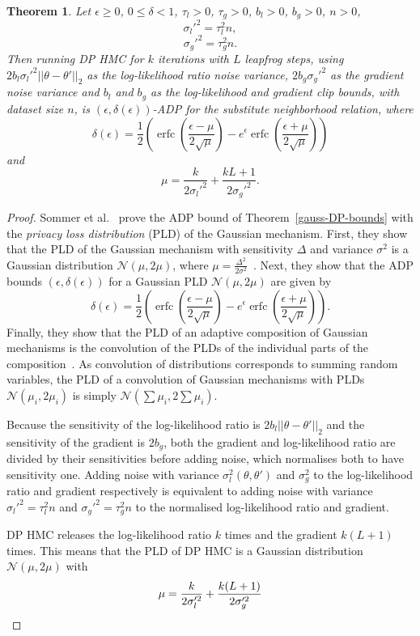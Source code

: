 \documentclass[english,twoside,openright]{HYgraduMLDS}
\newtheorem{theorem}[lemma]{Theorem}
\newcommand{\caln}{{\mathcal{N}}}
\DeclareMathOperator{\erfc}{erfc}
\begin{document}
\begin{theorem}\label{dp_hmc_theorem_adp}
  Let \(\epsilon \geq 0\), \(0 \leq \delta < 1\), \(\tau_{l} > 0\),
  \(\tau_{g} > 0\), \(b_{l} > 0\), \(b_{g} > 0\), \(n > 0\),
  \[
    \sigma_{l}'^{2} = \tau_{l}^{2}n,
  \]
  \[
    \sigma_{g}'^{2} = \tau_{g}^{2}n.
  \]
  Then running DP HMC for \(k\) iterations with \(L\) leapfrog steps,
  using \(2b_{l}\sigma_{l}'^{2}||\theta - \theta'||_{2}\) as the log-likelihood ratio
  noise variance, \(2b_{g}\sigma_{g}'^{2}\) as the gradient noise variance
  and \(b_{l}\) and \(b_{g}\) as the log-likelihood and gradient clip bounds,
  with dataset size \(n\), is \((\epsilon, \delta(\epsilon))\)-ADP for the
  substitute neighborhood relation, where
  \[
    \delta(\epsilon) = \frac{1}{2}\left(
      \erfc\left(\frac{\epsilon - \mu}{2\sqrt{\mu}}\right)
      - e^{\epsilon}\erfc\left(\frac{\epsilon + \mu}{2\sqrt{\mu}}\right)\right)
  \]
  and
  \[
    \mu = \frac{k}{2\sigma_{l}'^{2}} + \frac{kL + 1}{2\sigma_{g}'^{2}}.
  \]
\end{theorem}
\begin{proof}
Sommer et al.~\cite{Sommer2019} prove the ADP bound of Theorem~\ref{gauss-DP-bounds} with
the \emph{privacy loss distribution} (PLD) of the Gaussian mechanism. First, they
show that the PLD of the Gaussian mechanism with sensitivity \(\Delta\) and variance
\(\sigma^{2}\) is a Gaussian distribution
\(\caln(\mu, 2\mu)\), where \(\mu = \frac{\Delta^{2}}{2\sigma^{2}}\)~\cite[Lemma 11]{Sommer2019}.
Next, they show that the ADP bounds \((\epsilon, \delta(\epsilon))\) for a
Gaussian PLD \(\caln(\mu, 2\mu)\) are given by~\cite[Lemma 12]{Sommer2019}
\[
  \delta(\epsilon) = \frac{1}{2}\left(
    \erfc\left(\frac{\epsilon - \mu}{2\sqrt{\mu}}\right)
    - e^{\epsilon}\erfc\left(\frac{\epsilon + \mu}{2\sqrt{\mu}}\right)\right).
\]
Finally, they show that the PLD of an adaptive composition of Gaussian mechanisms
is the convolution of
the PLDs of the individual parts of the composition~\cite[Theorem 1]{Sommer2019}.
As convolution of distributions corresponds to summing random variables, the PLD of a
convolution of Gaussian mechanisms with PLDs \(\caln(\mu_{i}, 2\mu_{i})\) is
simply \(\caln(\sum \mu_{i}, 2\sum \mu_{i})\).

Because the sensitivity of the log-likelihood ratio is
\(2b_{l}||\theta - \theta'||_{2}\) and the sensitivity of the gradient is
\(2b_{g}\), both the gradient and log-likelihood ratio are divided by their
sensitivities before adding noise, which normalises both to have sensitivity
one. Adding noise with variance \(\sigma_{l}^2(\theta, \theta')\)
and \(\sigma_{g}^{2}\) to the log-likelihood ratio and gradient respectively
is equivalent to adding noise with variance
\(\sigma_{l}'^{2} = \tau_{l}^{2}n\) and \(\sigma_{g}'^{2} = \tau_{g}^{2}n\)
to the normalised log-likelihood ratio and gradient.

DP HMC releases the log-likelihood ratio \(k\) times and the gradient
\(k(L + 1)\) times. This means that the PLD of DP HMC is a Gaussian distribution
\(\caln(\mu, 2\mu)\) with
\[
  \mu = \frac{k}{2\sigma_{l}'^{2}} + \frac{k(L + 1)}{2\sigma_{g}'^{2}}
  \qedhere
\]
\end{proof}
\end{document}
